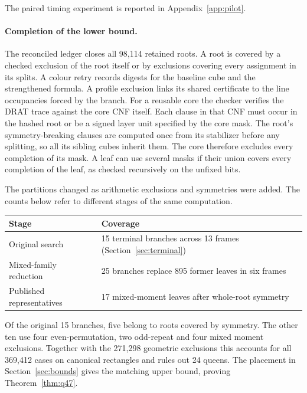 \documentclass[11pt]{article}
\begin{document}
The paired timing experiment is reported in Appendix~\ref{app:pilot}.

\paragraph{Completion of the lower bound.}
The reconciled ledger closes all 98,114 retained roots. A root is covered
by a checked exclusion of the root itself or by exclusions covering every
assignment in its splits. A colour retry records digests for the baseline
cube and the strengthened formula. A profile exclusion links its shared
certificate to the line occupancies forced by the branch. For a reusable core the checker verifies the DRAT trace
against the core CNF itself. Each clause in that CNF must occur in the
hashed root or be a signed layer unit specified by the core mask.
The root's symmetry-breaking clauses are computed once from its
stabilizer before any splitting, so all its sibling cubes inherit them. The core therefore excludes every completion of its mask.
A leaf can use several masks if their union covers every completion of
the leaf, as checked recursively on the unfixed bits.

The partitions changed as arithmetic exclusions and symmetries were added.
The counts below refer to different stages of the same computation.
\begin{center}
\begin{tabular}{@{}ll@{}}
\toprule
Stage & Coverage \\
\midrule
Original search & 15 terminal branches across 13 frames (Section~\ref{sec:terminal})\\
Mixed-family reduction & 25 branches replace 895 former leaves in six frames\\
Published representatives & 17 mixed-moment leaves after whole-root symmetry\\
\bottomrule
\end{tabular}
\end{center}
Of the original 15 branches, five belong to roots covered by symmetry.
The other ten use four even-permutation, two odd-repeat and four mixed
moment exclusions.
Together with the 271,298 geometric exclusions this accounts for all
369,412 cases on canonical rectangles and rules out 24 queens. The placement in
Section~\ref{sec:bounds} gives the matching upper bound, proving
Theorem~\ref{thm:q47}.
\end{document}
